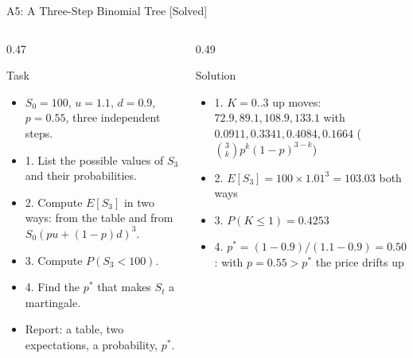 \begin{frame}{A5: A Three-Step Binomial Tree [Solved]}
\itemsize{\footnotesize}
\begin{columns}[T]
\begin{column}{0.47\textwidth}
\begin{block}{Task}
\begin{itemize}
    \item $S_0 = 100$, $u = 1.1$, $d = 0.9$, $p = 0.55$, three independent steps.
    \item 1. List the possible values of $S_3$ and their probabilities.
    \item 2. Compute $E[S_3]$ in two ways: from the table and from $S_0(pu + (1 - p)d)^3$.
    \item 3. Compute $P(S_3 < 100)$.
    \item 4. Find the $p^*$ that makes $S_t$ a martingale.
    \item Report: a table, two expectations, a probability, $p^*$.
\end{itemize}
\end{block}
\end{column}
\begin{column}{0.49\textwidth}
\begin{exampleblock}{Solution}
\begin{itemize}
    \item 1. $K = 0..3$ up moves: $72.9, 89.1, 108.9, 133.1$ with $0.0911, 0.3341, 0.4084, 0.1664$ ($\binom{3}{k}p^k(1-p)^{3-k}$)
    \item 2. $E[S_3] = 100 \times 1.01^3 = 103.03$ both ways
    \item 3. $P(K \le 1) = 0.4253$
    \item 4. $p^* = (1 - 0.9)/(1.1 - 0.9) = 0.50$: with $p = 0.55 > p^*$ the price drifts up
\end{itemize}
\end{exampleblock}
\end{column}
\end{columns}
\end{frame}

